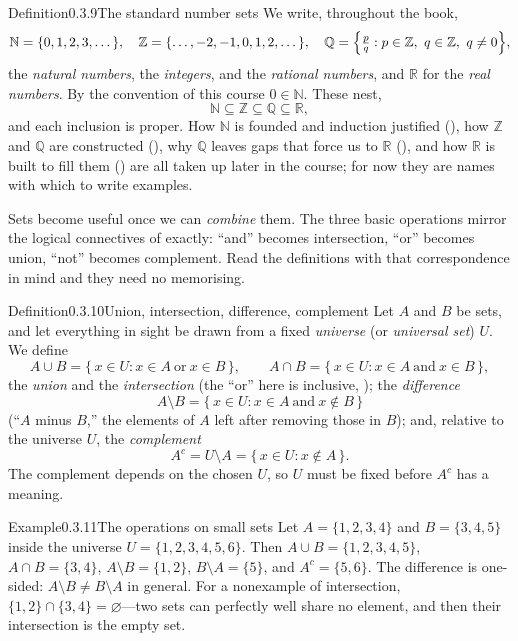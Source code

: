 \documentclass[main.tex]{subfiles}
\begin{document}
\begin{Obj}{Definition}{0.3.9}{The standard number sets}
We write, throughout the book,
\[
\mathbb N=\{0,1,2,3,\dots\},\quad \mathbb Z=\{\dots,-2,-1,0,1,2,\dots\},\quad
\mathbb Q=\Bigl\{\tfrac{p}{q} : p\in\mathbb Z,\ q\in\mathbb Z,\ q\neq 0\Bigr\},
\]
the \emph{natural numbers}, the \emph{integers}, and the \emph{rational numbers}, and $\mathbb R$ for
the \emph{real numbers}. By the convention of this course $0\in\mathbb N$. These nest,
\[
\mathbb N\subseteq\mathbb Z\subseteq\mathbb Q\subseteq\mathbb R,
\]
and each inclusion is proper. How $\mathbb N$ is founded and induction justified (), how
$\mathbb Z$ and $\mathbb Q$ are constructed (), why $\mathbb Q$ leaves gaps that force us
to $\mathbb R$ (), and how $\mathbb R$ is built to fill them () are all taken up
later in the course; for now they are names with which to write examples.
\end{Obj}

\noindent Sets become useful once we can \emph{combine} them. The three basic operations mirror the
logical connectives of  exactly: ``and'' becomes intersection, ``or'' becomes union, ``not''
becomes complement. Read the definitions with that correspondence in mind and they need no memorising.

\begin{Obj}{Definition}{0.3.10}{Union, intersection, difference, complement}
Let $A$ and $B$ be sets, and let everything in sight be drawn from a fixed \emph{universe} (or
\emph{universal set}) $U$. We define
\[
A\cup B=\{\,x\in U : x\in A \ \text{or}\ x\in B\,\},\qquad
A\cap B=\{\,x\in U : x\in A \ \text{and}\ x\in B\,\},
\]
the \emph{union} and the \emph{intersection} (the ``or'' here is inclusive, ); the
\emph{difference}
\[
A\setminus B=\{\,x\in U : x\in A \ \text{and}\ x\notin B\,\}
\]
(``$A$ minus $B$,'' the elements of $A$ left after removing those in $B$); and, relative to the
universe $U$, the \emph{complement}
\[
A^{c}=U\setminus A=\{\,x\in U : x\notin A\,\}.
\]
The complement depends on the chosen $U$, so $U$ must be fixed before $A^{c}$ has a meaning.
\end{Obj}

\begin{ObjL}{Example}{0.3.11}{The operations on small sets}
Let $A=\{1,2,3,4\}$ and $B=\{3,4,5\}$ inside the universe $U=\{1,2,3,4,5,6\}$. Then
$A\cup B=\{1,2,3,4,5\}$, $A\cap B=\{3,4\}$, $A\setminus B=\{1,2\}$, $B\setminus A=\{5\}$, and
$A^{c}=\{5,6\}$. The difference is one-sided: $A\setminus B\neq B\setminus A$ in general. For a
nonexample of intersection, $\{1,2\}\cap\{3,4\}=\varnothing$---two sets can perfectly well share no
element, and then their intersection is the empty set.
\end{ObjL}
\end{document}
